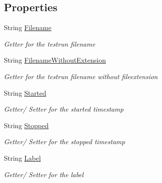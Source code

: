 \subsection*{Properties}
\begin{DoxyCompactItemize}
\item 
String \hyperlink{class_web_analyzer_1_1_models_1_1_data_model_1_1_test_model_a4353d075e751f00ca785cf5702f00910}{Filename}
\begin{DoxyCompactList}\small\item\em Getter for the testrun filename \end{DoxyCompactList}\item 
String \hyperlink{class_web_analyzer_1_1_models_1_1_data_model_1_1_test_model_a91b896389e06b664e992c719f4d73e9b}{Filename\+Without\+Extension}
\begin{DoxyCompactList}\small\item\em Getter for the testrun filename without fileextension \end{DoxyCompactList}\item 
String \hyperlink{class_web_analyzer_1_1_models_1_1_data_model_1_1_test_model_acdb09845b9c3bc8582f78d2729524216}{Started}
\begin{DoxyCompactList}\small\item\em Getter/ Setter for the started timestamp \end{DoxyCompactList}\item 
String \hyperlink{class_web_analyzer_1_1_models_1_1_data_model_1_1_test_model_a636a8cedde376c835de9d909e8ec2c2d}{Stopped}
\begin{DoxyCompactList}\small\item\em Getter/ Setter for the stopped timestamp \end{DoxyCompactList}\item 
String \hyperlink{class_web_analyzer_1_1_models_1_1_data_model_1_1_test_model_a2ac39416a04e9771399c9003ca669848}{Label}
\begin{DoxyCompactList}\small\item\em Getter/ Setter for the label \end{DoxyCompactList}\item 

\end{DoxyCompactItemize}
